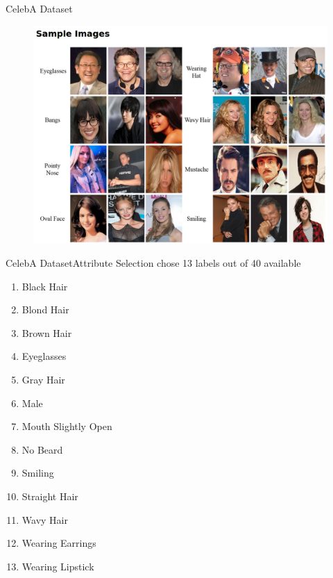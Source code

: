 \documentclass{beamer}
\begin{document}
\begin{frame}{CelebA Dataset}
	\begin{figure}
		\centering
		\includegraphics[width=0.9\linewidth]{figures/CelebAExamples}
		\label{fig:celebAExamples}
	\end{figure}
\end{frame}

\begin{frame}{CelebA Dataset}{Attribute Selection}
	chose 13 labels out of 40 available
	\begin{multicols}{2}
	\begin{enumerate}
	\item Black Hair
	\item Blond Hair
	\item Brown Hair
	\item Eyeglasses
	\item Gray Hair
	\item Male
	\item Mouth Slightly Open
	\item No Beard
	\item Smiling
	\item Straight Hair
	\item Wavy Hair
	\item Wearing Earrings
	\item Wearing Lipstick
	\end{enumerate}
	\end{multicols}
\end{frame}
\end{document}
